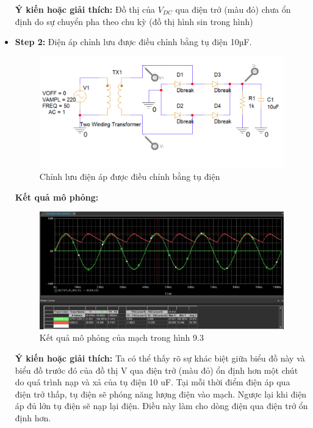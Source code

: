\begin{itemize}
    \textbf{Ý kiến hoặc giải thích:} Đồ thị của \(V_{DC}\) qua điện trở (màu đỏ) chưa ổn định do sự chuyển pha theo chu kỳ (đồ thị hình sin trong hình)
    
    \item \textbf{Step 2:} Điện áp chỉnh lưu được điều chỉnh bằng tụ điện 10µF.
    
    \begin{figure}[ht]
        \centering
        \includegraphics[scale= 0.26]{graphics/ex9/f3.png}
        \caption{Chỉnh lưu điện áp được điều chỉnh bằng tụ điện}
    \end{figure}
\pagebreak
    \textbf{Kết quả mô phỏng: }

    \begin{figure}[ht]
        \centering
        \includegraphics[scale= 0.2]{graphics/ex9/f4.png}
        \caption{Kết quả mô phỏng của mạch trong hình 9.3}
    \end{figure}
    
    \textbf{Ý kiến hoặc giải thích:} Ta có thể thấy rõ sự khác biệt giữa biểu đồ này và biểu đồ trước đó của đồ thị V qua điện trở (màu đỏ) ổn định hơn một chút do quá trình nạp và xả của tụ điện 10 uF. Tại mỗi thời điểm điện áp qua điện trở thấp, tụ điện sẽ phóng năng lượng điện vào mạch. Ngược lại khi điện áp đủ lớn tụ điện sẽ nạp lại điện. Điều này làm cho dòng điện qua điện trở ổn định hơn.
    

\end{itemize}
